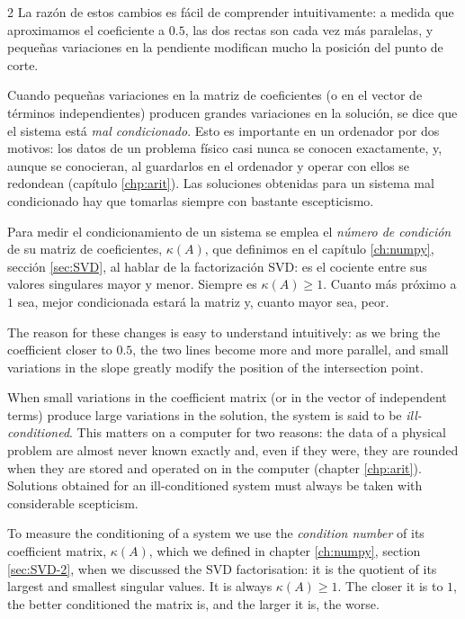 \begin{paracol}{2}
\switchcolumn
La razón de estos cambios es fácil de comprender intuitivamente: a medida que aproximamos el coeficiente a $0.5$, las dos rectas son cada vez más paralelas, y pequeñas variaciones en la pendiente modifican mucho la posición del punto de corte.

Cuando pequeñas variaciones en la matriz de coeficientes (o en el vector de términos independientes) producen grandes variaciones en la solución, se dice que el sistema está \emph{mal condicionado}. Esto es importante en un ordenador por dos motivos: los datos de un problema físico casi nunca se conocen exactamente, y, aunque se conocieran, al guardarlos en el ordenador y operar con ellos se redondean (capítulo \ref{chp:arit}). Las soluciones obtenidas para un sistema mal condicionado hay que tomarlas siempre con bastante escepticismo.

Para medir el condicionamiento de un sistema se emplea el \emph{número de condición} de su matriz de coeficientes, $\kappa(A)$, que definimos en el capítulo \ref{ch:numpy}, sección \ref{sec:SVD}, al hablar de la factorización SVD: es el cociente entre sus valores singulares mayor y menor. Siempre es $\kappa(A)\geq 1$. Cuanto más próximo a $1$ sea, mejor condicionada estará la matriz y, cuanto mayor sea, peor.

\switchcolumn
The reason for these changes is easy to understand intuitively: as we bring the coefficient closer to $0.5$, the two lines become more and more parallel, and small variations in the slope greatly modify the position of the intersection point.

When small variations in the coefficient matrix (or in the vector of independent terms) produce large variations in the solution, the system is said to be \emph{ill-conditioned}. This matters on a computer for two reasons: the data of a physical problem are almost never known exactly and, even if they were, they are rounded when they are stored and operated on in the computer (chapter \ref{chp:arit}). Solutions obtained for an ill-conditioned system must always be taken with considerable scepticism.

To measure the conditioning of a system we use the \emph{condition number} of its coefficient matrix, $\kappa(A)$, which we defined in chapter \ref{ch:numpy}, section \ref{sec:SVD-2}, when we discussed the SVD factorisation: it is the quotient of its largest and smallest singular values. It is always $\kappa(A)\geq 1$. The closer it is to $1$, the better conditioned the matrix is, and the larger it is, the worse.


\end{paracol}
